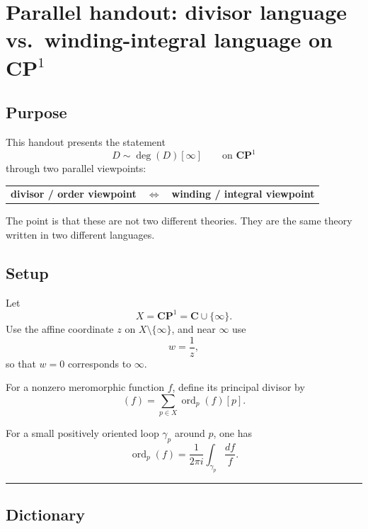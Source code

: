 \documentclass[11pt]{article}
\begin{document}
	\newpage
	\section*{Parallel handout: divisor language vs.\ winding-integral language on \texorpdfstring{$\mathbf{CP}^1$}{CP1}}
	
	\subsection*{Purpose}
	
	This handout presents the statement
	\[
	D\sim \deg(D)[\infty]
	\qquad\text{on } \mathbf{CP}^1
	\]
	through two parallel viewpoints:
	
	\begin{center}
		\begin{tabular}{c c c}
			\textbf{divisor / order viewpoint}
			&
			\(\Longleftrightarrow\)
			&
			\textbf{winding / integral viewpoint}
		\end{tabular}
	\end{center}
	
	The point is that these are not two different theories. They are the same theory written in two different languages.
	
	\bigskip
	
	\subsection*{Setup}
	
	Let
	\[
	X=\mathbf{CP}^1=\mathbf{C}\cup\{\infty\}.
	\]
	Use the affine coordinate \(z\) on \(X\setminus\{\infty\}\), and near \(\infty\) use
	\[
	w=\frac{1}{z},
	\]
	so that \(w=0\) corresponds to \(\infty\).
	
	For a nonzero meromorphic function \(f\), define its principal divisor by
	\[
	(f)=\sum_{p\in X}\operatorname{ord}_p(f)[p].
	\]
	
	For a small positively oriented loop \(\gamma_p\) around \(p\), one has
	\[
	\operatorname{ord}_p(f)=\frac{1}{2\pi i}\int_{\gamma_p}\frac{df}{f}.
	\]
	
	\bigskip
	\hrule
	\bigskip
	
	\subsection*{Dictionary}
	
\end{document}
